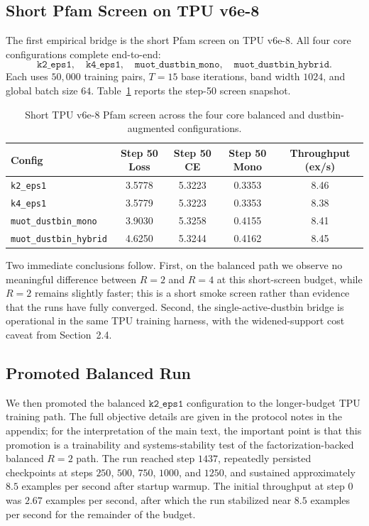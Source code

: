 \subsection{Short Pfam Screen on TPU v6e-8}

The first empirical bridge is the short Pfam screen on TPU v6e-8. All four core configurations complete end-to-end:
\[
\texttt{k2\_eps1},\quad
\texttt{k4\_eps1},\quad
\texttt{muot\_dustbin\_mono},\quad
\texttt{muot\_dustbin\_hybrid}.
\]
Each uses $50{,}000$ training pairs, $T=15$ base iterations, band width $1024$, and global batch size $64$. Table~\ref{tab:screen_unified} reports the step-50 screen snapshot.

\begin{table}[h]
    \centering
    \begin{tabular}{@{}lcccc@{}}
        \toprule
        Config & Step 50 Loss & Step 50 CE & Step 50 Mono & Throughput (ex/s) \\
        \midrule
        \texttt{k2\_eps1} & 3.5778 & 5.3223 & 0.3353 & 8.46 \\
        \texttt{k4\_eps1} & 3.5779 & 5.3223 & 0.3353 & 8.38 \\
        \texttt{muot\_dustbin\_mono} & 3.9030 & 5.3258 & 0.4155 & 8.41 \\
        \texttt{muot\_dustbin\_hybrid} & 4.6250 & 5.3244 & 0.4162 & 8.45 \\
        \bottomrule
    \end{tabular}
    \caption{Short TPU v6e-8 Pfam screen across the four core balanced and dustbin-augmented configurations.}
    \label{tab:screen_unified}
\end{table}

Two immediate conclusions follow. First, on the balanced path we observe no meaningful difference between $R=2$ and $R=4$ at this short-screen budget, while $R=2$ remains slightly faster; this is a short smoke screen rather than evidence that the runs have fully converged. Second, the single-active-dustbin bridge is operational in the same TPU training harness, with the widened-support cost caveat from Section~2.4.

\subsection{Promoted Balanced Run}

We then promoted the balanced $\texttt{k2\_eps1}$ configuration to the longer-budget TPU training path. The full objective details are given in the protocol notes in the appendix; for the interpretation of the main text, the important point is that this promotion is a trainability and systems-stability test of the factorization-backed balanced $R=2$ path. The run reached step $1437$, repeatedly persisted checkpoints at steps $250$, $500$, $750$, $1000$, and $1250$, and sustained approximately $8.5$ examples per second after startup warmup. The initial throughput at step $0$ was $2.67$ examples per second, after which the run stabilized near $8.5$ examples per second for the remainder of the budget.

